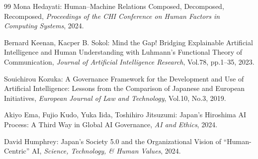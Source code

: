 \documentclass{keikaku}
\begin{document}
\begin{thebibliography}{99}
    Mona Hedayati: Human--Machine Relations Composed, Decomposed, Recomposed, \textit{Proceedings of the CHI Conference on Human Factors in Computing Systems}, 2024.

    Bernard Keenan, Kacper B. Sokol: Mind the Gap! Bridging Explainable Artificial Intelligence and Human Understanding with Luhmann's Functional Theory of Communication, \textit{Journal of Artificial Intelligence Research}, Vol.78, pp.1--35, 2023.

    Souichirou Kozuka: A Governance Framework for the Development and Use of Artificial Intelligence: Lessons from the Comparison of Japanese and European Initiatives, \textit{European Journal of Law and Technology}, Vol.10, No.3, 2019.

    Akiyo Ema, Fujio Kudo, Yuka Iida, Toshihiro Jitsuzumi: Japan's Hiroshima AI Process: A Third Way in Global AI Governance, \textit{AI and Ethics}, 2024.

    David Humphrey: Japan's Society 5.0 and the Organizational Vision of ``Human-Centric'' AI, \textit{Science, Technology, \& Human Values}, 2024.

\end{thebibliography}
\end{document}
